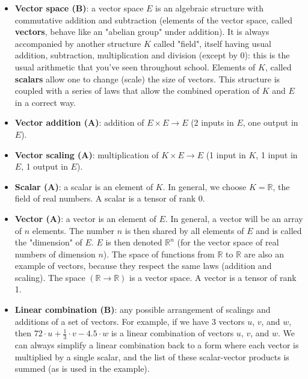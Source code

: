 \documentclass{article}
\begin{document}
\begin{itemize}
    \item \textbf{Vector space (B)}: a vector space $E$ is an algebraic structure with commutative addition and subtraction (elements of the vector space, called \textbf{vectors}, behave like an "abelian group" under addition). It is always accompanied by another structure $K$ called "field", itself having usual addition, subtraction, multiplication and division (except by 0): this is the usual arithmetic that you've seen throughout school. Elements of $K$, called \textbf{scalars} allow one to change (scale) the size of vectors. This structure is coupled with a series of laws that allow the combined operation of $K$ and $E$ in a correct way.
    
    \item \textbf{Vector addition (A)}: addition of $E \times E \rightarrow E$ (2 inputs in $E$, one output in $E$).
    
    \item \textbf{Vector scaling (A)}: multiplication of $K \times E \rightarrow E$ (1 input in $K$, 1 input in $E$, 1 output in $E$).
    
    \item \textbf{Scalar (A)}: a scalar is an element of $K$. In general, we choose $K = \mathbb{R}$, the field of real numbers. A scalar is a tensor of rank 0.
    
    \item \textbf{Vector (A)}: a vector is an element of $E$. In general, a vector will be an array of $n$ elements. The number $n$ is then shared by all elements of $E$ and is called the "dimension" of $E$. $E$ is then denoted $\mathbb{R}^n$ (for the vector space of real numbers of dimension $n$). The space of functions from $\mathbb{R}$ to $\mathbb{R}$ are also an example of vectors, because they respect the same laws (addition and scaling). The space $(\mathbb{R} \rightarrow \mathbb{R})$ is a vector space. A vector is a tensor of rank 1.
    
    \item \textbf{Linear combination (B)}: any possible arrangement of scalings and additions of a set of vectors. For example, if we have 3 vectors $u$, $v$, and $w$, then $72 \cdot u + \frac{1}{3} \cdot v - 4.5 \cdot w$ is a linear combination of vectors $u$, $v$, and $w$. We can always simplify a linear combination back to a form where each vector is multiplied by a single scalar, and the list of these scalar-vector products is summed (as is used in the example).
    

\end{itemize}
\end{document}
